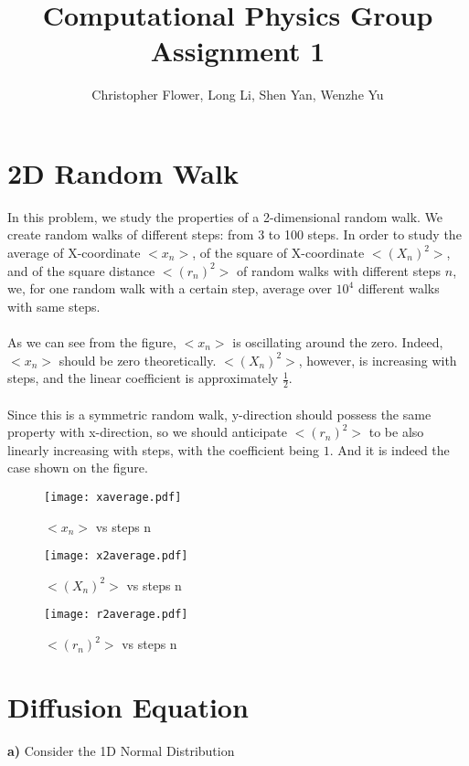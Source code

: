 \documentclass{article}
\begin{document}
\title{\textbf{Computational Physics Group Assignment 1}}
\author{Christopher Flower, Long Li, Shen Yan, Wenzhe Yu}
\maketitle

\section{2D Random Walk}

In this problem, we study the properties of a 2-dimensional random walk. We create random walks of different steps: from 3 to 100 steps. 
In order to study the average of X-coordinate $<x_n>$, of the square of X-coordinate $<(X_n)^2>$, and of the square distance $<(r_n)^2>$ of random walks with different steps $n$, we, for one random walk with a certain step, average over $10^4$ different walks with same steps. \\
\\
As we can see from the figure, $<x_n>$ is oscillating around the zero. Indeed, $<x_n>$ should be zero theoretically. $<(X_n)^2>$, however, is increasing with steps, and the linear coefficient is approximately $\frac{1}{2}$. \\
\\
Since this is a symmetric random walk, y-direction should possess the same property with x-direction, so we should anticipate $<(r_n)^2>$ to be also linearly increasing with steps, with the coefficient being $1$. And it is indeed the case shown on the figure.

\begin{figure}[h!]
\centering
\texttt{[image: xaverage.pdf]}
\caption{  $<x_n>$ vs steps n}
\label{xaverage}
\end{figure}

\begin{figure}[h!]
\centering
\texttt{[image: x2average.pdf]}
\caption{ $<(X_n)^2>$ vs steps n}
\label{x2average}
\end{figure}

\begin{figure}[h!]
\centering
\texttt{[image: r2average.pdf]}
\caption{ $<(r_n)^2>$ vs steps n}
\label{r2average}
\end{figure}



\section{Diffusion Equation}
\textbf{a)} Consider the 1D Normal Distribution
\end{document}

